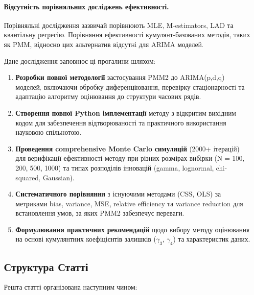 \documentclass[12pt,a4paper]{article}
\begin{document}
	\paragraph{Відсутність порівняльних досліджень ефективності.} Порівняльні дослідження зазвичай порівнюють MLE, M-estimators, LAD та квантільну регресію. Порівняння ефективності кумулянт-базованих методів, таких як PMM, відносно цих альтернатив відсутні для ARIMA моделей.
	
	Дане дослідження заповнює ці прогалини шляхом:
	
	\begin{enumerate}
		\item \textbf{Розробки повної методології} застосування PMM2 до ARIMA(p,d,q) моделей, включаючи обробку диференціювання, перевірку стаціонарності та адаптацію алгоритму оцінювання до структури часових рядів.
		
		\item \textbf{Створення повної Python імплементації} методу з відкритим вихідним кодом для забезпечення відтворюваності та практичного використання науковою спільнотою.
		
		\item \textbf{Проведення comprehensive Monte Carlo симуляцій} (2000+ ітерацій) для верифікації ефективності методу при різних розмірах вибірки (N = 100, 200, 500, 1000) та типах розподілів інновацій (gamma, lognormal, chi-squared, Gaussian).
		
		\item \textbf{Систематичного порівняння} з існуючими методами (CSS, OLS) за метриками bias, variance, MSE, relative efficiency та variance reduction для встановлення умов, за яких PMM2 забезпечує переваги.
		
		\item \textbf{Формулювання практичних рекомендацій} щодо вибору методу оцінювання на основі кумулянтних коефіцієнтів залишків ($\gamma_3$, $\gamma_4$) та характеристик даних.
	\end{enumerate}
	
	\subsection{Структура Статті}
	\label{subsec:structure}
	
	Решта статті організована наступним чином:
	
\end{document}
